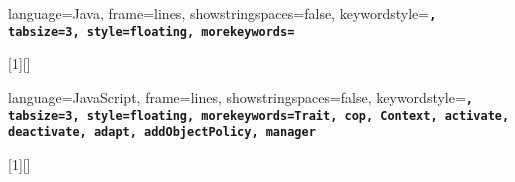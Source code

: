 
 {language=Java,
  frame=lines,
  showstringspaces=false,
  keywordstyle=\tt\bf,
  tabsize=3,
  style=floating,
  morekeywords={}
}

[1][]
 {\lstset{style=java,#1}}{}  

 {language=JavaScript,
  frame=lines,
  showstringspaces=false,
  keywordstyle=\tt\bf,
  tabsize=3,
  style=floating,
  morekeywords={Trait, cop, Context, activate, deactivate, adapt, addObjectPolicy, manager}
}

[1][]
 {\lstset{style=ctxtraits,#1}}{}  


\newcommand{\scode}[1]{\textrm{\texttt{#1}}}
\def\scode{\lstinline[style=ctxtraits]}

%----[ Commands ]---
%Latins
\newcommand{\eg}{\emph{e.g.,}\xspace}
\newcommand{\ie}{\emph{i.e.,}\xspace}
\newcommand{\cf}{\emph{cf.}\xspace}

\newcommand{\ctx}[1]{\texttt{\textsc{#1}}}




\newcommand{\authorcomment}[3][comment]
  {\ifdraft{\noindent
      \fbox{\footnotesize\textcolor{author}{\textsc{#2}}}
      \textcolor{#1}{\textsl{#3}}}{}}

